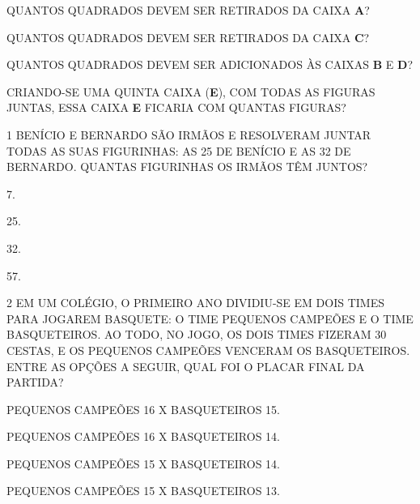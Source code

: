 
\item QUANTOS QUADRADOS DEVEM SER RETIRADOS DA CAIXA \textbf{A}?


\item QUANTOS QUADRADOS DEVEM SER RETIRADOS DA CAIXA \textbf{C}?


\item QUANTOS QUADRADOS DEVEM SER ADICIONADOS ÀS CAIXAS \textbf{B} E \textbf{D}?


\item CRIANDO-SE UMA QUINTA CAIXA (\textbf{E}), COM TODAS AS FIGURAS JUNTAS, ESSA CAIXA \textbf{E} FICARIA COM QUANTAS FIGURAS?



\num{1} BENÍCIO E BERNARDO SÃO IRMÃOS E RESOLVERAM JUNTAR TODAS AS
SUAS FIGURINHAS: AS 25 DE BENÍCIO E AS 32 DE BERNARDO. QUANTAS FIGURINHAS OS
IRMÃOS TÊM JUNTOS?

\begin{escolha}
\item
  7.
\item
  25.
\item
  32.
\item
  57.
\end{escolha}


\num{2} EM UM COLÉGIO, O PRIMEIRO ANO DIVIDIU-SE EM DOIS TIMES PARA JOGAREM BASQUETE: O TIME PEQUENOS CAMPEÕES E O TIME BASQUETEIROS. AO TODO, NO JOGO, OS DOIS TIMES FIZERAM 30 CESTAS, E OS PEQUENOS CAMPEÕES VENCERAM OS BASQUETEIROS. ENTRE AS OPÇÕES A SEGUIR, QUAL FOI O PLACAR FINAL DA PARTIDA?

\begin{escolha}
\item
  PEQUENOS CAMPEÕES 16 X BASQUETEIROS 15.
\item
  PEQUENOS CAMPEÕES 16 X BASQUETEIROS 14.
\item
  PEQUENOS CAMPEÕES 15 X BASQUETEIROS 14.
\item
  PEQUENOS CAMPEÕES 15 X BASQUETEIROS 13.
\end{escolha}

